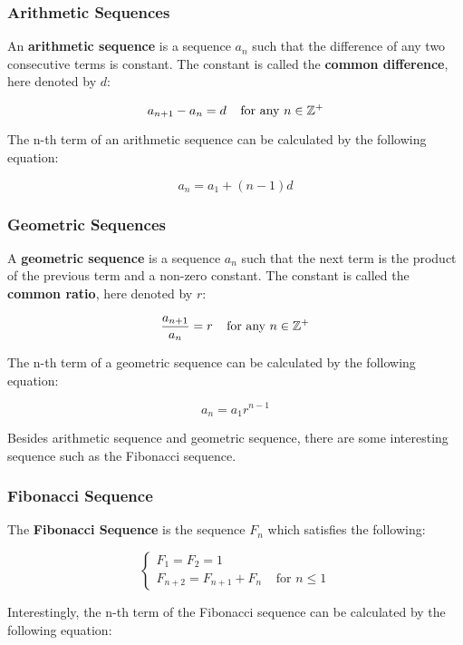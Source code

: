 \documentclass[a4paper,12pt]{article}
\begin{document}
\subsubsection{Arithmetic Sequences}
\begin{dft}
  An \textbf{arithmetic sequence} is a sequence $a_{n}$ such that the difference of any two consecutive terms is constant. The constant is called the \textbf{common difference}, here denoted by $d$:

  $$a_{n+1}-a_{n}=d\;\;\;\;\text{for any }n\in \mathbb{Z}^{+}$$
\end{dft}\n

The n-th term of an arithmetic sequence can be calculated by the following equation:

$$a_{n}=a_{1}+(n-1)d$$

\subsubsection{Geometric Sequences}
\begin{dft}
  A \textbf{geometric sequence} is a sequence $a_{n}$ such that the next term is the product of the previous term and a non-zero constant. The constant is called the \textbf{common ratio}, here denoted by $r$:

  $$\frac{a_{n+1}}{a_{n}}=r\;\;\;\;\text{for any }n\in \mathbb{Z}^{+}$$
\end{dft}\n

The n-th term of a geometric sequence can be calculated by the following equation:

$$a_{n}=a_{1}r^{n-1}$$\s

Besides arithmetic sequence and geometric sequence, there are some interesting sequence such as the Fibonacci sequence.

\subsubsection{Fibonacci Sequence}
\begin{dft}
  The \textbf{Fibonacci Sequence} is the sequence $F_{n}$ which satisfies the following:

  $$\left\{\begin{matrix}
    F_{1}=F_{2}=1 \\
    F_{n+2}=F_{n+1}+F_{n}\;\;\;\;\text{for }n\leq 1
  \end{matrix}\right.$$
\end{dft}\n

Interestingly, the n-th term of the Fibonacci sequence can be calculated by the following equation:
\end{document}
